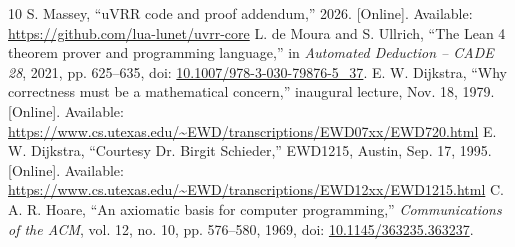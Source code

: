 \documentclass[10pt,journal,letterpaper]{IEEEtran}
\begin{document}
\begin{thebibliography}{10}
 S. Massey, ``uVRR code and proof addendum,'' 2026. [Online]. Available: \url{https://github.com/lua-lunet/uvrr-core}
 L. de Moura and S. Ullrich, ``The Lean 4 theorem prover and programming language,'' in \emph{Automated Deduction -- CADE 28}, 2021, pp. 625--635, doi: \href{https://doi.org/10.1007/978-3-030-79876-5_37}{10.1007/978-3-030-79876-5\_37}.
 E. W. Dijkstra, ``Why correctness must be a mathematical concern,'' inaugural lecture, Nov. 18, 1979. [Online]. Available: \url{https://www.cs.utexas.edu/~EWD/transcriptions/EWD07xx/EWD720.html}
 E. W. Dijkstra, ``Courtesy Dr. Birgit Schieder,'' EWD1215, Austin, Sep. 17, 1995. [Online]. Available: \url{https://www.cs.utexas.edu/~EWD/transcriptions/EWD12xx/EWD1215.html}
 C. A. R. Hoare, ``An axiomatic basis for computer programming,'' \emph{Communications of the ACM}, vol. 12, no. 10, pp. 576--580, 1969, doi: \href{https://doi.org/10.1145/363235.363237}{10.1145/363235.363237}.
\end{thebibliography}
\end{document}
